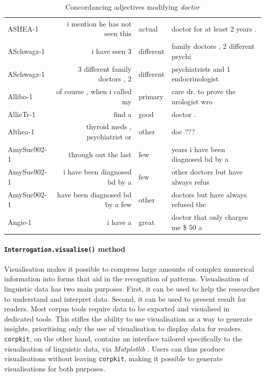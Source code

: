 \FloatBarrier

\begin{table}[htb]
\footnotesize
\begin{tabular}{lrll}

\toprule
     ASHEA-1 & i mention he has not seen this &  actual    &  doctor for at least 2 years .       \\
  ASchwagz-1 &                  i have seen 3 &  different &  family doctors , 2 different psychi \\
  ASchwagz-1 & 3 different family doctors , 2 &  different &  psychiatrists and 1 endocrinologist \\
    Allibo-1 &   of course , when i called my &  primary   &  care dr. to prove the urologist wro \\
   AllieTr-1 &                         find a &  good      &  doctor .                            \\
    Althea-1 & thyroid meds , psychiatrist or &  other     &  doc ???                             \\
 AmySue902-1 &           through out the last &  few       &  years i have been diagnosed bd by a \\
 AmySue902-1 &  i have been diagnosed bd by a &  few       &  other doctors but have always refus \\
 AmySue902-1 & have been diagnosed bd by a few &  other    &  doctors but have always refused the \\
     Angie-1 &                       i have a &  great     &  doctor that only charges me \$ 50 a  \\
\bottomrule
\end{tabular}
\caption{Concordancing adjectives modifying \emph{doctor}}
\label{conc:mod_doc_example}
\end{table}

\paragraph{\texttt{Interrogation.visualise()} method}

Visualisation makes it possible to compress large amounts of complex numerical information into forms that aid in the recognition of patterns. Visualisation of linguistic data has two main purposes. First, it can be used to help the researcher to understand and interpret data. Second, it can be used to present result for readers. Most corpus tools require data to be exported and visualised in dedicated tools. This stifles the ability to use visualisation as a way to generate insights, prioritising only the use of visualisation to display data for readers. \texttt{corpkit}, on the other hand, contains an interface tailored specifically to the visualisation of linguistic data, via \emph{Matplotlib} \cite{matplotlib_2007}. Users can thus produce visualisations without leaving \texttt{corpkit}, making it possible to generate visualisations for both purposes.

